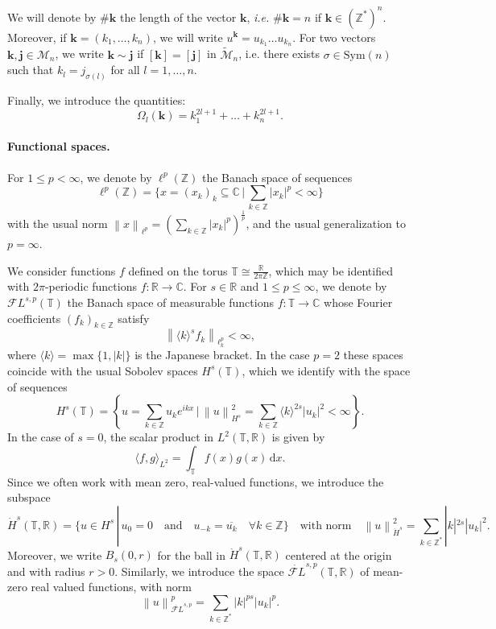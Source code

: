 \documentclass[a4paper,10pt,reqno]{article}
\theoremstyle{definition}
\theoremstyle{plain}
\theoremstyle{plain}
\theoremstyle{definition}
\theoremstyle{plain}
\theoremstyle{plain}
\theoremstyle{plain}
\theoremstyle{definition}
\theoremstyle{definition}
\newcommand{\norm}[1]{\left\lVert #1 \right\rVert}
\def \Z{\mathbb Z}
\def \R{\mathbb R}
\def \C{\mathbb C}
\def \T{\mathbb{T}}
\def \FL{\mathcal{F}L}
\def \M{\mathcal{M}}
\def \k{\bm{k}}
\def \j{\bm{j}}
\begin{document}
We will denote by $\#\bm{k}$ the length of the vector $\bm{k}$, \textit{i.e.} $\#\bm{k} = n$ if $\bm{k} \in (\Z^*)^n$. 
Moreover, if $\bm{k} = (k_1,\ldots,k_n)$, we will write $u^{\bm{k}}=u_{k_1}\ldots u_{k_n}$. For two vectors $\k,\j\in\M_n$, we write $\k\sim\j$ if $[\k]=[\j]$ in $\widetilde{\M}_n$, i.e. there exists $\sigma\in\mbox{Sym}(n)$ such that $k_l=j_{\sigma (l)}$ for all $l=1,\ldots,n$.

Finally, we introduce the quantities:
\begin{equation}
\Omega_l(\bm{k}) = k_1^{2l+1}+\ldots+k_n^{2l+1}.
\label{def: resonant relation}
\end{equation}

\paragraph{Functional spaces.} For $1\le p < \infty$, we denote by $\ell^p(\Z)$ the Banach space of sequences
\[
\ell^p(\Z)=\biggl \{ x=(x_k)_k \subseteq \mathbb{C} \, \biggl | \, \sum_{k \in \Z}|x_k|^p < \infty \biggr \}
\]
with the usual norm $\norm{x}_{\ell^p}=\left(\sum_{k \in \Z}|x_k|^p \right)^{\frac{1}{p}}$, and the usual generalization to $p=\infty.$ 

We consider functions $f$ defined on the torus $\T \cong \frac{\R}{2\pi \Z}$, which may be identified with $2\pi$-periodic functions $f: \R \rightarrow \C.$ 
For $s\in\R$ and $1\leq p\leq \infty$, we denote by $\FL^{s,p}(\T)$ the Banach space of measurable functions $f:\T \rightarrow \C$ whose Fourier coefficients $(f_k)_{k\in\Z}$ satisfy
\[
\norm{\langle k \rangle^s f_k}_{\ell^p_k} < \infty,
\]
where $\langle k \rangle=\max\{ 1,|k|\}$ is the  Japanese bracket. 
In the case $p=2$ these spaces coincide with the usual Sobolev spaces $H^s(\T)$, which we identify with the space of sequences 
\[
H^s(\T) = \left \{ u = \sum_{k \in \Z} u_k e^{ikx} \, \bigg| \, \norm{u}_{H^s}^2 = \sum_{k \in \Z} \langle k \rangle^{2s} |u_k|^2 < \infty \right \}.
\]
In the case of $s=0$, the scalar product in $L^2(\T,\R)$ is given by 
\[
\langle f,g \rangle_{L^2} = \int_{\T} f(x)g(x) \, \mathrm{d} x.
\]
Since we often work with mean zero, real-valued functions, we introduce the subspace
\begin{equation} \label{def:hs}
\dot{H}^s(\T,\R) = \{ u \in H^s \, | \, u_0=0 \quad \text{and} \quad u_{-k} = \overline{u_k} \quad \forall k \in \Z \}\quad \mbox{with norm}\quad
\norm{u}_{\dot{H}^s}^2 = \sum_{k \in \Z^*} |k|^{2s} |u_k|^2.
\end{equation}
Moreover, we write $B_s(0,r)$ for the ball in $\dot{H}^s(\T,\R)$ centered at the origin and with radius $r>0$.
Similarly, we introduce the space $\dot{\FL}^{s,p}(\T,\R)$ of mean-zero real valued functions, with norm
\begin{equation} \label{def: norm flsp}
\norm{u}_{\dot{\FL}^{s,p}}^p = \sum_{k \in \Z^*} |k|^{ps} |u_k|^p.
\end{equation}
\end{document}
